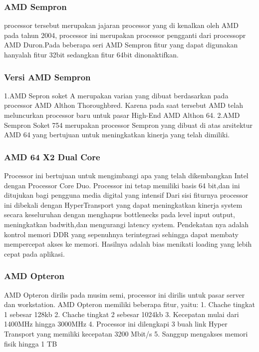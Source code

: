  			\subsubsection {AMD Sempron}
 	processor tersebut merupakan jajaran processor yang di kenalkan oleh AMD pada tahun 2004, processor ini merupakan processor pengganti dari processopr AMD Duron.Pada beberapa seri AMD Sempron fitur yang dapat digunakan hanyalah fitur 32bit sedangkan fitur 64bit dinonaktifkan.
 			\subsubsection {Versi AMD Sempron}
 	 1.AMD Sepron soket A merupakan varian yang dibuat berdasarkan pada processor AMD Althon Thoroughbred. Karena pada saat tersebut AMD telah meluncurkan processor baru untuk pasar High-End AMD Althon 64.
 	 2.AMD Sempron Soket 754 merupakan processor Sempron yang dibuat di atas arsitektur AMD 64 yang bertujuan untuk meningkatkan kinerja yang telah dimiliki.


			\subsubsection{AMD 64 X2 Dual Core}
 	Processor ini bertujuan untuk mengimbangi apa yang telah dikembangkan Intel dengan Processor Core Duo. Processor ini tetap memiliki basis 64 bit,dan ini ditujukan bagi pengguna media digital yang intensif
 	Dari sisi fiturnya processor ini dibekali dengan HyperTransport yang dapat meningkatkan kinerja system secara keseluruhan dengan menghapus bottlenecks pada level input output, meningkatkan badwith,dan mengurangi latency system. Pendekatan nya adalah kontrol memori DDR yang sepenuhnya terintegrasi sehingga dapat membaty mempercepat akses ke memori. Hasilnya adalah bias menikati loading yang lebih cepat pada aplikasi.


 			\subsubsection{AMD Opteron}
	AMD Opteron dirilis pada musim semi, processor ini dirilis untuk pasar server dan workstation. AMD Opteron memiliki beberapa fitur, yaitu:
		1. Chache tingkat 1 sebesar 128kb
		2. Chache tingkat 2 sebesar 1024kb
		3. Kecepatan mulai dari 1400MHz hingga 3000MHz
		4. Processor ini dilengkapi 3 buah link Hyper Transport yang memiliki kecepatan 3200 Mbit/s
		5. Sanggup mengakses memori fisik hingga 1 TB 


